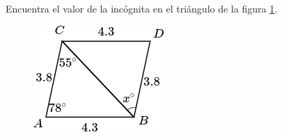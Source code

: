 Encuentra el valor de la incógnita en el triángulo de la figura \ref{fig:angle_triangle_05}.

\begin{minipage}[t][][t]{0.35\textwidth}
    \begin{figure}[H]
        \centering
        \includegraphics[width=0.9\linewidth]{../images/angle_triangle_05.png}

        \caption{}
        \label{fig:angle_triangle_05}
    \end{figure}
\end{minipage}\hfill
\begin{minipage}[t][][t]{0.6\textwidth}
    \begin{solutionbox}{4.5cm}

    \end{solutionbox}
\end{minipage}

